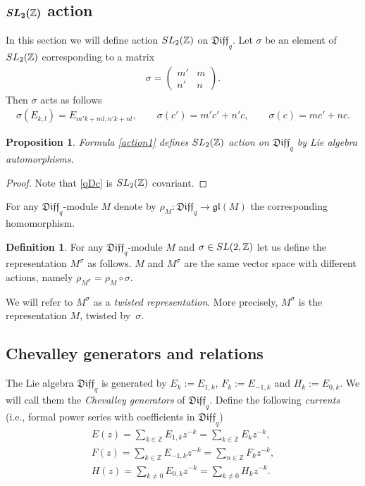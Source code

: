 \documentclass[11pt]{article}
\numberwithin{equation}{section}
\newtheorem{Proposition}[Theorem]{Proposition}
\theoremstyle{definition}
\newtheorem{Definition}[Theorem]{Definition}
\newcommand{\qD}{\mathfrak{Diff}_q}
\begin{document}
\subsection[${\rm SL}_2(\mathbb{Z} )$ action]{$\boldsymbol{{\rm SL}_2(\mathbb{Z} )}$ action}

In this section we will define action ${\rm SL}_2 ( \mathbb{Z} )$ on $\qD$. Let $\sigma$ be an element of ${\rm SL}_2 ( \mathbb{Z} )$ corresponding to a matrix
\begin{gather*}
\sigma = \begin{pmatrix}
m' & m \\
n' & n
\end{pmatrix}. %
\end{gather*}
Then $\sigma$ acts as follows
\begin{gather} \label{action1}
\sigma( E_{k,l} ) = E_{ m' k + m l, n' k + n l }, \qquad
\sigma (c') = m' c' + n' c, \qquad \sigma (c) = m c' + n c.
\end{gather}

\begin{Proposition} Formula \eqref{action1} defines ${\rm SL}_2 ( \mathbb{Z} )$ action on $\qD$ by Lie algebra automorphisms.
\end{Proposition}
\begin{proof} Note that \eqref{qDc} is ${\rm SL}_2 ( \mathbb{Z} )$ covariant. \end{proof}

For any $\qD$-module $M$ denote by $\rho_{M} \colon \qD \rightarrow \mathfrak{gl} (M)$ the corresponding homomorphism.

\begin{Definition} \label{twisted} For any $\qD$-module $M$ and $\sigma \in {\rm SL}(2,\mathbb{Z})$ let us define the representation $M^\sigma$ as follows. $M$ and $M^{\sigma}$ are the same vector space with different actions, namely $\rho_{M^{\sigma}} = \rho_M \circ \sigma$.
\end{Definition}

We will refer to $M^{\sigma}$ as a \emph{twisted representation}. More precisely, $M^{\sigma}$ is the representation $M$, twisted by~$\sigma$.

\subsection{Chevalley generators and relations}

The Lie algebra $\qD$ is generated by $E_k := E_{1, k}$, $F_k:=E_{-1, k}$ and $H_k := E_{0, k}$. We will call them the \emph{Chevalley generators} of $\qD$.
Define the following \emph{currents} (i.e., formal power series with coefficients in $\qD$)
\begin{gather*}
E(z) = \sum_{k \in \mathbb{Z}} E_{1,k} z^{-k} = \sum_{k \in \mathbb{Z}} E_k z^{-k},\\
F(z) = \sum_{k \in \mathbb{Z}} E_{-1, k} z^{-k} = \sum_{n \in \mathbb{Z}} F_k z^{-k},\\
H(z) = \sum_{k \neq 0} E_{0, k} z^{-k} = \sum_{k \neq 0} H_k z^{-k}.
\end{gather*}
\end{document}
